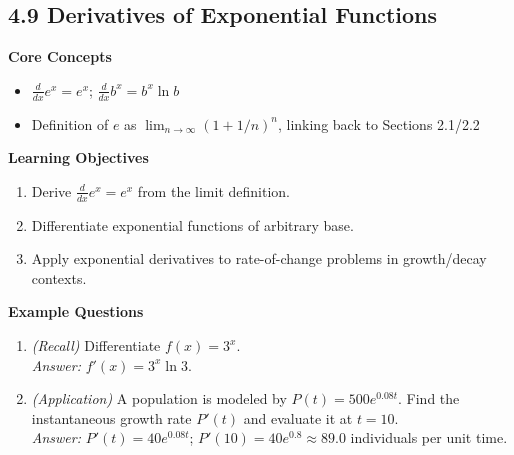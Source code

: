 \documentclass[11pt]{article}
\begin{document}
\subsection{4.9 Derivatives of Exponential Functions}
\textbf{Core Concepts}
\begin{itemize}
\item $\frac{d}{dx}e^x = e^x$; $\frac{d}{dx}b^x = b^x\ln b$
\item Definition of $e$ as $\lim_{n\to\infty}(1+1/n)^n$, linking back to Sections 2.1/2.2
\end{itemize}
\textbf{Learning Objectives}
\begin{enumerate}
\item Derive $\frac{d}{dx}e^x=e^x$ from the limit definition.
\item Differentiate exponential functions of arbitrary base.
\item Apply exponential derivatives to rate-of-change problems in growth/decay contexts.
\end{enumerate}
\textbf{Example Questions}
\begin{enumerate}
\item \emph{(Recall)} Differentiate $f(x) = 3^x$. \\
\textit{Answer:} $f'(x) = 3^x\ln 3$.
\item \emph{(Application)} A population is modeled by $P(t)=500e^{0.08t}$. Find the instantaneous growth rate $P'(t)$ and evaluate it at $t=10$. \\
\textit{Answer:} $P'(t) = 40e^{0.08t}$; $P'(10) = 40e^{0.8}\approx 89.0$ individuals per unit time.
\end{enumerate}
\end{document}
